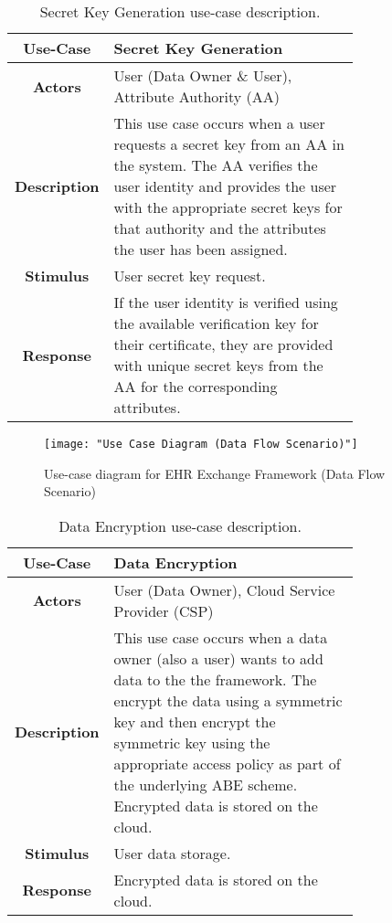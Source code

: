 \begin{table}[]
	\centering
	\begin{tabular}{|c|p{0.75\linewidth}|}
		\hline
		\textbf{Use-Case}    & Secret Key Generation                                   \\ \hline
		\textbf{Actors}      & User (Data Owner \& User), Attribute Authority (AA)                        \\ \hline
		\textbf{Description} & This use case occurs when a user requests a secret key from an AA in the system. The AA verifies the user identity and provides the user with the appropriate secret keys for that authority and the attributes the user has been assigned. \\ \hline
		\textbf{Stimulus}    & User secret key request.                    \\ \hline
		\textbf{Response}    & If the user identity is verified using the available verification key for their certificate, they are provided with unique secret keys from the AA for the corresponding attributes.             \\ \hline
	\end{tabular}
	\caption{Secret Key Generation use-case description.}
	\label{tab:use_case_skgen}
\end{table}


\begin{figure}[]
\centering
\texttt{[image: "Use Case Diagram (Data Flow Scenario)"]}
\caption{Use-case diagram for EHR Exchange Framework (Data Flow Scenario)}
\label{fig:use_case_df}
\end{figure}


\begin{table}[]
	\centering
	\begin{tabular}{|c|p{0.75\linewidth}|}
		\hline
		\textbf{Use-Case}    & Data Encryption                                   \\ \hline
		\textbf{Actors}      & User (Data Owner), Cloud Service Provider (CSP)                        \\ \hline
		\textbf{Description} & This use case occurs when a data owner (also a user) wants to add data to the the framework. The encrypt the data using a symmetric key and then encrypt the symmetric key using the appropriate access policy as part of the underlying ABE scheme. Encrypted data is stored on the cloud. \\ \hline
		\textbf{Stimulus}    & User data storage.                    \\ \hline
		\textbf{Response}    & Encrypted data is stored on the cloud.            \\ \hline
	\end{tabular}
	\caption{Data Encryption use-case description.}
	\label{tab:use_case_enc}
\end{table}

